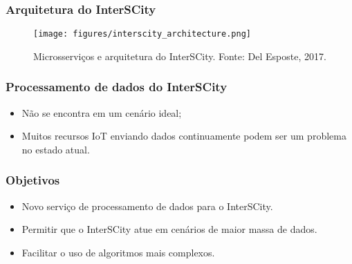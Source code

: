 \begin{frame}
    \frametitle{Arquitetura do InterSCity}
    \begin{figure}
        \texttt{[image: figures/interscity\_architecture.png]}
        \caption{Microsserviços e arquitetura do InterSCity. Fonte: Del Esposte, 2017.}
    \end{figure}
\end{frame}

\begin{frame}
    \frametitle{Processamento de dados do InterSCity}
    \begin{itemize}
        \item Não se encontra em um cenário ideal;
        \item Muitos recursos IoT enviando dados continuamente podem ser um
            problema no estado atual.
    \end{itemize}
\end{frame}

\begin{frame}
    \frametitle{Objetivos}
    \begin{itemize}
        \item Novo serviço de processamento de dados para o InterSCity.
        \item Permitir que o InterSCity atue em cenários de maior massa de dados.
        \item Facilitar o uso de algoritmos mais complexos.
    \end{itemize}
\end{frame}
